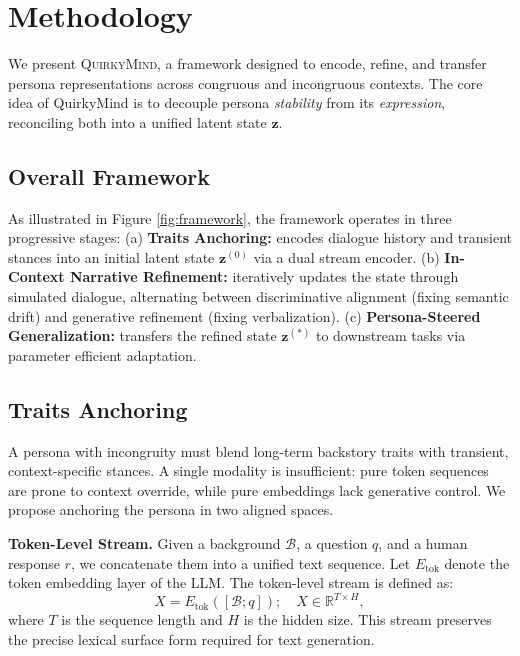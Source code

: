 


\section{Methodology}\label{sec:method}
We present \textsc{QuirkyMind}, a framework designed to encode, refine, and transfer persona representations across congruous and incongruous contexts. The core idea of QuirkyMind is to decouple persona \textit{stability} from its \textit{expression}, reconciling both into a unified latent state $\mathbf{z}$.




\subsection{Overall Framework}
As illustrated in Figure \ref{fig:framework}, the framework operates in three progressive stages:
(a) \textbf{Traits Anchoring:} encodes dialogue history and transient stances into an initial latent state $\mathbf{z}^{(0)}$ via a dual stream encoder.
(b) \textbf{In-Context Narrative Refinement:} iteratively updates the state through simulated dialogue, alternating between discriminative alignment (fixing semantic drift) and generative refinement (fixing verbalization).
(c) \textbf{Persona-Steered Generalization:} transfers the refined state $\mathbf{z}^{(*)}$ to downstream tasks via parameter efficient adaptation.












\subsection{Traits Anchoring}\label{sec:encode}
A persona with incongruity must blend long-term backstory traits with transient, context-specific stances. A single modality is insufficient: pure token sequences are prone to context override, while pure embeddings lack generative control. We propose anchoring the persona in two aligned spaces.




\noindent \textbf{Token-Level Stream.}
Given a background $\mathcal{B}$, a question $q$, and a human response $r$, we concatenate them into a unified text sequence. Let $E_{\text{tok}}$ denote the token embedding layer of the LLM. The token-level stream is defined as:
\begin{equation}
    X = E_{\text{tok}}([\mathcal{B}; q]); \quad X \in \mathbb{R}^{T \times H},
\end{equation}
where $T$ is the sequence length and $H$ is the hidden size. This stream preserves the precise lexical surface form required for text generation.




